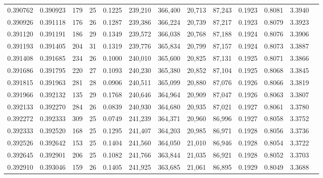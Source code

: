 \begin{tabular}{rrrrrrrrrrrrr}
0.390762 & 0.390923 &   179 &  25 &                                     0.1225 & 239,210 & 366,400 &  20,713 &  87,243 & 0.1923 & 0.8081 & 3.3940 \\
0.390926 & 0.391118 &   176 &  26 &                                     0.1287 & 239,386 & 366,224 &  20,739 &  87,217 & 0.1923 & 0.8079 & 3.3923 \\
0.391120 & 0.391191 &   186 &  29 &                                     0.1349 & 239,572 & 366,038 &  20,768 &  87,188 & 0.1924 & 0.8076 & 3.3906 \\
0.391193 & 0.391405 &   204 &  31 &                                     0.1319 & 239,776 & 365,834 &  20,799 &  87,157 & 0.1924 & 0.8073 & 3.3887 \\
0.391408 & 0.391685 &   234 &  26 &                                     0.1000 & 240,010 & 365,600 &  20,825 &  87,131 & 0.1925 & 0.8071 & 3.3866 \\
0.391686 & 0.391795 &   220 &  27 &                                     0.1093 & 240,230 & 365,380 &  20,852 &  87,104 & 0.1925 & 0.8068 & 3.3845 \\
0.391815 & 0.391963 &   281 &  28 &                                     0.0906 & 240,511 & 365,099 &  20,880 &  87,076 & 0.1926 & 0.8066 & 3.3819 \\
0.391966 & 0.392132 &   135 &  29 &                                     0.1768 & 240,646 & 364,964 &  20,909 &  87,047 & 0.1926 & 0.8063 & 3.3807 \\
0.392133 & 0.392270 &   284 &  26 &                                     0.0839 & 240,930 & 364,680 &  20,935 &  87,021 & 0.1927 & 0.8061 & 3.3780 \\
0.392272 & 0.392333 &   309 &  25 &                                     0.0749 & 241,239 & 364,371 &  20,960 &  86,996 & 0.1927 & 0.8058 & 3.3752 \\
0.392333 & 0.392520 &   168 &  25 &                                     0.1295 & 241,407 & 364,203 &  20,985 &  86,971 & 0.1928 & 0.8056 & 3.3736 \\
0.392526 & 0.392642 &   153 &  25 &                                     0.1404 & 241,560 & 364,050 &  21,010 &  86,946 & 0.1928 & 0.8054 & 3.3722 \\
0.392645 & 0.392901 &   206 &  25 &                                     0.1082 & 241,766 & 363,844 &  21,035 &  86,921 & 0.1928 & 0.8052 & 3.3703 \\
0.392910 & 0.393046 &   159 &  26 &                                     0.1405 & 241,925 & 363,685 &  21,061 &  86,895 & 0.1929 & 0.8049 & 3.3688 \\

\end{tabular}
